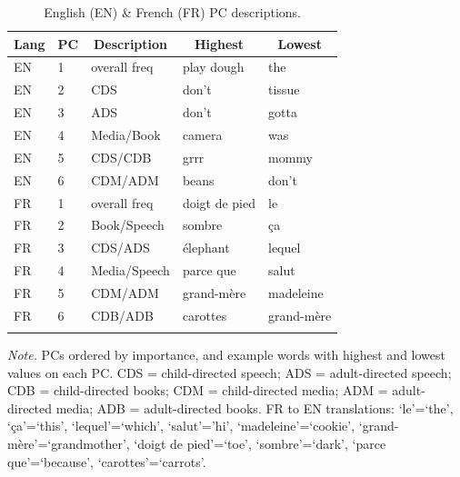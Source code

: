 \documentclass[10pt, letterpaper]{article}
\newenvironment{CodeChunk}{}{}
\begin{document}
\begin{CodeChunk}



\begin{table}[tbp]

\begin{center}
\begin{threeparttable}

\caption{\label{tab:table3}English (EN) \& French (FR) PC descriptions.}

\begin{tabular}{lllll}
\toprule
Lang & \multicolumn{1}{c}{PC} & \multicolumn{1}{c}{Description} & \multicolumn{1}{c}{Highest} & \multicolumn{1}{c}{Lowest}\\
\midrule
EN & 1 & overall freq & play dough & the\\
EN & 2 & CDS & don't & tissue\\
EN & 3 & ADS & don't & gotta\\
EN & 4 & Media/Book & camera & was\\
EN & 5 & CDS/CDB & grrr & mommy\\
EN & 6 & CDM/ADM & beans & don't\\
FR & 1 & overall freq & doigt de pied & le\\
FR & 2 & Book/Speech & sombre & ça\\
FR & 3 & CDS/ADS & élephant & lequel\\
FR & 4 & Media/Speech & parce que & salut\\
FR & 5 & CDM/ADM & grand-mère & madeleine\\
FR & 6 & CDB/ADB & carottes & grand-mère\\
\bottomrule
\addlinespace
\end{tabular}

\begin{tablenotes}[para]
\normalsize{\textit{Note.} PCs ordered by importance, and example words with highest and lowest values on each PC. CDS = child-directed speech; ADS = adult-directed speech; CDB = child-directed books; CDM = child-directed media; ADM = adult-directed media; ADB = adult-directed books. FR to EN translations: `le'=`the', `ça'=`this', `lequel'=`which', `salut'='hi', `madeleine'=`cookie', `grand-mère'=`grandmother', `doigt de pied'=`toe', `sombre'=`dark', `parce que'=`because', `carottes'=`carrots'.}
\end{tablenotes}

\end{threeparttable}
\end{center}

\end{table}


\end{CodeChunk}
\end{document}
